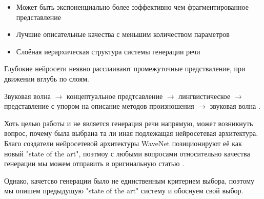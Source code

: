 \documentclass[../diploma.tex]{subfiles}
\begin{document}
\begin{itemize}
    \begin{itemize}
        \item Может быть экспоненциально более ээффективно чем фрагментированное представление
        \item Лучшие описательные качества с меньшим количеством параметров
    \end{itemize}
\end{itemize}

\begin{itemize}
    \item Слоёная иерархическая структура системы генерации речи
\end{itemize}

Глубокие нейросети неявно расслаивают промежуточные предстваление, при движении вглубь по слоям.

Звуковая волна $\rightarrow$ концептуальное предтсавление $\rightarrow$ лингвистическое $\rightarrow$ представление с упором на описание методов произношения $\rightarrow$ звуковая волна
\cite{pres:google_dl_speech}.




Хоть целью работы и не является генерация речи напрямую, может возникнуть вопрос, почему была выбрана та ли иная подлежащая нейросетевая архитектура. Благо создатели нейросетевой архитектуры WaveNet  позиционируют её как новый "state of the art", поэтмоу с любыми вопросами относительно качества генерации мы можем отправить в оригинальную статью \cite{article:van2016wavenet}.

Однако, качетсво генерации было не единственным критерием выбора, поэтому мы опишем предыдущую "state of the art" систему и обоснуем свой выбор. 
\end{document}
